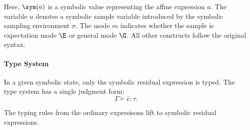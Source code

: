 Here, $\sym(a)$ is a symbolic value representing the affine expression $a$. The variable $u$ denotes a symbolic sample variable introduced by the symbolic sampling environment $\sigma$. The mode $m$ indicates whether the sample is expectation mode $\E$ or general mode $\G$. All other constructs follow the original syntax.

\paragraph{Type System}

In a given symbolic state, only the symbolic residual expression is typed. The type system has a single judgment form:
\[
  \Gamma \vdash \hat e : \tau.
\]

The typing rules from the ordinary expresisons lift to symbolic residual expressions. 

